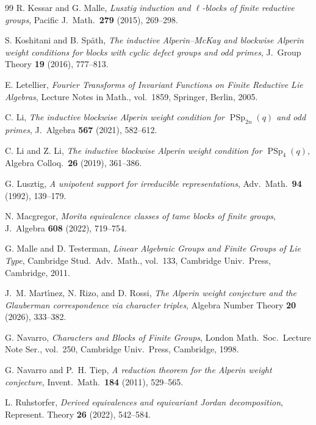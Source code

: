 \documentclass[10pt]{amsart}
\theoremstyle{definition}
\numberwithin{equation}{section}
\numberwithin{table}{section}
\begin{document}
\begin{thebibliography}{99}
R. Kessar and G. Malle,
{\it Lusztig induction and $\ell$-blocks of finite reductive groups},
Pacific J.\ Math.\ \textbf{279} (2015), 269--298.

S. Koshitani and B. Sp\"ath,
{\it The inductive Alperin--McKay and blockwise Alperin weight conditions
for blocks with cyclic defect groups and odd primes},
J.\ Group Theory \textbf{19} (2016), 777--813.

E. Letellier,
{\it Fourier Transforms of Invariant Functions on Finite Reductive Lie Algebras},
Lecture Notes in Math., vol.~1859,
Springer, Berlin, 2005.

C. Li,
{\it The inductive blockwise Alperin weight condition for
$\operatorname{PSp}_{2n}(q)$ and odd primes},
J.\ Algebra \textbf{567} (2021), 582--612.

C. Li and Z. Li,
{\it The inductive blockwise Alperin weight condition for
$\operatorname{PSp}_4(q)$},
Algebra Colloq.\ \textbf{26} (2019), 361--386.

G. Lusztig,
{\it A unipotent support for irreducible representations},
Adv.\ Math.\ \textbf{94} (1992), 139--179.

N. Macgregor,
{\it Morita equivalence classes of tame blocks of finite groups},
J.\ Algebra \textbf{608} (2022), 719--754.

G. Malle and D. Testerman,
{\it Linear Algebraic Groups and Finite Groups of Lie Type},
Cambridge Stud.\ Adv.\ Math., vol.~133,
Cambridge Univ.\ Press, Cambridge, 2011.

J.~M. Mart\'{\i}nez, N. Rizo, and D. Rossi,
{\it The Alperin weight conjecture and the Glauberman correspondence via
character triples},
Algebra Number Theory \textbf{20} (2026), 333--382.

G. Navarro,
{\it Characters and Blocks of Finite Groups},
London Math.\ Soc.\ Lecture Note Ser., vol.~250,
Cambridge Univ.\ Press, Cambridge, 1998.

G. Navarro and P.~H. Tiep,
{\it A reduction theorem for the Alperin weight conjecture},
Invent.\ Math.\ \textbf{184} (2011), 529--565.

L. Ruhstorfer,
{\it Derived equivalences and equivariant Jordan decomposition},
Represent. Theory \textbf{26} (2022), 542--584.


\end{thebibliography}
\end{document}
